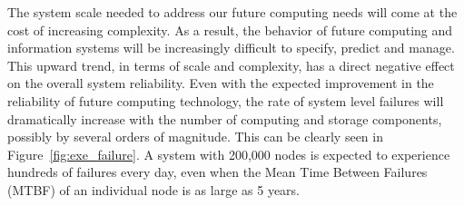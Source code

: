 
The system scale needed to address our future computing needs will come at the cost of increasing complexity. As a result, the behavior of future computing and information systems will be increasingly difficult to specify, predict and manage.
This upward trend, in terms of scale and complexity, has a direct negative effect on the overall system reliability. 
Even with the expected improvement in the reliability of future computing technology, the rate of system level failures will dramatically increase with the number of computing and storage components, possibly by several orders of magnitude. This can be clearly seen in Figure~\ref{fig:exe_failure}. A system with 200,000 nodes is expected to experience hundreds of failures every day, even when the Mean Time Between Failures (MTBF) of an individual node is as large as 5 years. 

